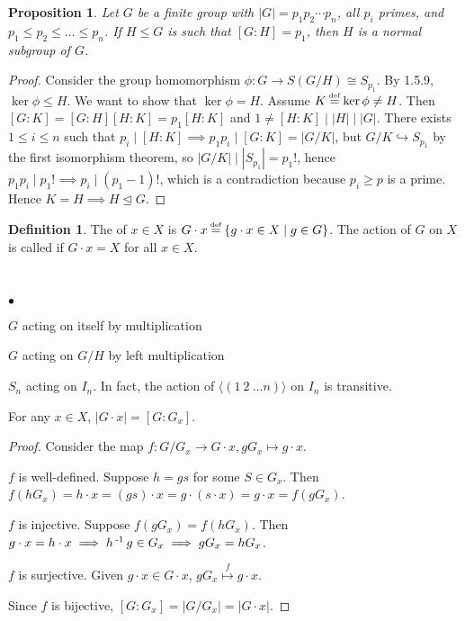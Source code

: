 \documentclass[11pt]{book}
\newcounter{counter}
\newtheorem{proposition}[counter]{Proposition}   \newtheorem{problem}[counter]{Problem}   \newtheorem*{proposition*}{Proposition}   \newtheorem*{lemma*}{Lemma}
\theoremstyle{definition}   \newtheorem{defn}[counter]{Definition} %
\newcommand{\nsg}{\mathrel{\unlhd}}   \newcommand{\ind}{\parindent24pt}   \newcommand{\vn}{\varnothing}
\newcommand\myeq{\mathrel{\overset{\makebox[0pt]{\mbox{\normalfont\tiny\sffamily \textrm{def}}}}{=}}}
\newcommand{\gen}[1]{\langle #1 \rangle}   \newcommand{\stab}[2]{\tn{Stab}_{#1}(#2)}   \newcommand{\fix}[2]{\tn{Fix}_{#1}(#2)}
\DeclareMathOperator{\ra}{\rightarrow}   \DeclareMathOperator{\Poly}{\mathbf{P}}   \DeclareMathOperator{\spn}{\textnormal{span}}   \DeclareMathOperator{\aut}{\textnormal{Aut}}
\newcommand{\vs}{\vspace{8pt}}
\numberwithin{counter}{chapter}
\begin{document}
\vs

\begin{proposition}
Let $G$ be a finite group with $|G| = p_1 p_2 \cdots p_n$, all $p_i$ primes, and $p_1 \leq p_2 \leq \dots \leq p_n$. If $H \leq G$ is such that $[G : H] = p_1$, then $H$ is a normal subgroup of $G$.
\end{proposition}

\begin{proof}
Consider the group homomorphism $\phi : G \ra S(G/H) \cong S_{p_1}$. By 1.5.9, $\ker \phi \leq H$. We want to show that $\ker \phi = H$. Assume $K \myeq \ker \phi \ne H$. Then $[G : K] = [G : H][H : K] = p_1 [H : K]$ and $1 \ne [H : K] \mid |H| \mid |G|$. There exists $1 \leq i \leq n$ such that $p_i \mid [H : K] \implies p_1p_i \mid [G : K] = |G/K|$, but $G/K \hookrightarrow S_{p_1}$ by the first isomorphism theorem, so $|G/K| \mid |S_{p_1}| = p_1!$, hence $p_1p_i \mid p_1! \implies p_i \mid (p_1-1)!$, which is a contradiction because $p_i \geq p$ is a prime. Hence $K = H \implies H \nsg G$.
\end{proof}

\vs

\begin{defn}
The  of $x \in X$ is $G\cdot x \myeq \{g\cdot x \in X \mid g \in G\}$. The action of $G$ on $X$ is called  if $G\cdot x = X$ for all $x \in X$.
\end{defn}

\vs

\begin{example*}
\
\begin{list}{$\bullet$}{}
\item $G$ acting on itself by multiplication
\item $G$ acting on $G/H$ by left multiplication
\item $S_n$ acting on $I_n$. In fact, the action of $\gen{(1\ 2\ \dots n)}$ on $I_n$ is transitive.
\end{list}
\end{example*}

\vs

\begin{lemma}
For any $x \in X$, $|G\cdot x| = [G : G_x]$.
\end{lemma}

\begin{proof}
Consider the map $f : G/G_x \ra G\cdot x, gG_x \mapsto g\cdot x$.

$f$ is well-defined. Suppose $h=gs$ for some $S \in G_x$. Then $f(hG_x) = h \cdot x = (gs) \cdot x = g\cdot(s\cdot x) = g\cdot x = f(g G_x)$.

$f$ is injective. Suppose $f(gG_x) = f(hG_x)$. Then $g\cdot x = h\cdot x \implies h\operatorname{^{-1}} g \in G_x \implies g G_x = h G_x$.

$f$ is surjective. Given $g\cdot x \in G\cdot x$, $g G_x \overset{f}{\longmapsto} g\cdot x$.

Since $f$ is bijective, $[G : G_x] = |G/G_x| = |G \cdot x|$.
\end{proof}
\end{document}
